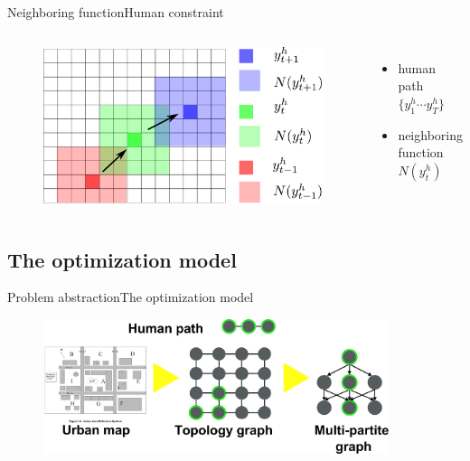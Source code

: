 \begin{frame}{Neighboring function}{Human constraint}

\begin{columns}
\begin{minipage}[c]{\linewidth}
\begin{figure}
\centering
\includegraphics[width = \textwidth]{./figure/humanConstraint}
\end{figure}
\end{minipage}

\begin{minipage}[c]{\linewidth}
\begin{itemize}
\item { human path $ \{ y^{h}_{1} \cdots y^{h}_{T} \} $ }
\item { neighboring function $ N( y^{h}_{t} ) $ }
\end{itemize}
\end{minipage}
\end{columns}

\end{frame}

\subsection{The optimization model}

\begin{frame}{Problem abstraction}{The optimization model}

\begin{figure}
\centering
\includegraphics[width = 0.9\textwidth]{./figure/layers}
\end{figure}

\end{frame}

